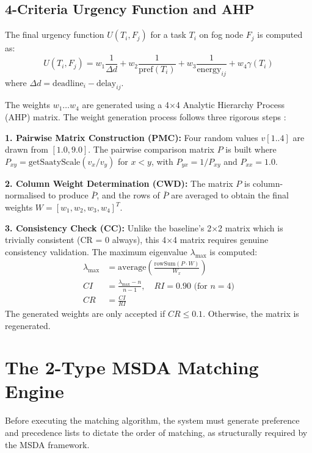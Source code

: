 \subsection{4-Criteria Urgency Function and AHP}
The final urgency function $U(T_i, F_j)$ for a task $T_i$ on fog node $F_j$ is computed as:
\begin{equation}
U(T_i, F_j) = w_1 \frac{1}{\Delta d} + w_2 \frac{1}{\text{pref}(T_i)} + w_3 \frac{1}{\text{energy}_{ij}} + w_4 \gamma(T_i)
\end{equation}
where $\Delta d = \text{deadline}_i - \text{delay}_{ij}$.

The weights $w_1 \ldots w_4$ are generated using a 4$\times$4 Analytic Hierarchy Process (AHP) matrix. The weight generation process follows three rigorous steps \cite{saaty1980ahp}:

\textbf{1. Pairwise Matrix Construction (PMC):} Four random values $v[1..4]$ are drawn from $[1.0, 9.0]$. The pairwise comparison matrix $P$ is built where $P_{xy} = \text{getSaatyScale}(v_x / v_y)$ for $x < y$, with $P_{yx} = 1/P_{xy}$ and $P_{xx} = 1.0$.

\textbf{2. Column Weight Determination (CWD):} The matrix $P$ is column-normalised to produce $\bar{P}$, and the rows of $\bar{P}$ are averaged to obtain the final weights $W = [w_1, w_2, w_3, w_4]^T$.

\textbf{3. Consistency Check (CC):} 
Unlike the baseline's 2$\times$2 matrix which is trivially consistent (CR = 0 always), this 4$\times$4 matrix requires genuine consistency validation. The maximum eigenvalue $\lambda_{\max}$ is computed:
\begin{align}
\lambda_{\max} &= \text{average}\left(\frac{\text{rowSum}(P \cdot W)}{W_x}\right) \\
CI &= \frac{\lambda_{\max} - n}{n - 1}, \quad RI = 0.90 \text{ (for } n=4\text{)} \\
CR &= \frac{CI}{RI}
\end{align}
The generated weights are only accepted if $CR \leq 0.1$. Otherwise, the matrix is regenerated.

\section{The 2-Type MSDA Matching Engine}

Before executing the matching algorithm, the system must generate preference and precedence lists to dictate the order of matching, as structurally required by the MSDA framework.

